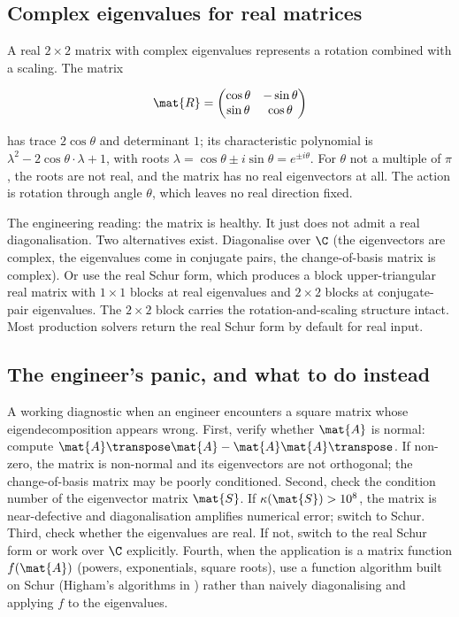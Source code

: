 \subsection{Complex eigenvalues for real matrices}

A real $2 \times 2$ matrix with complex eigenvalues represents a
rotation combined with a scaling. The matrix

\[
\mat{R} = \begin{pmatrix} \cos\theta & -\sin\theta \\ \sin\theta &
\cos\theta \end{pmatrix}
\]

has trace $2\cos\theta$ and determinant $1$; its characteristic
polynomial is $\lambda^{2} - 2\cos\theta \cdot \lambda + 1$, with
roots $\lambda = \cos\theta \pm i \sin\theta = e^{\pm i \theta}$.
For $\theta$ not a multiple of $\pi$, the roots are not real, and
the matrix has no real eigenvectors at all. The action is rotation
through angle $\theta$, which leaves no real direction fixed.

The engineering reading: the matrix is healthy. It just does not
admit a real diagonalisation. Two alternatives exist. Diagonalise
over $\C$ (the eigenvectors are complex, the eigenvalues come in
conjugate pairs, the change-of-basis matrix is complex). Or use the
real Schur form, which produces a block upper-triangular real
matrix with $1 \times 1$ blocks at real eigenvalues and $2 \times 2$
blocks at conjugate-pair eigenvalues. The $2 \times 2$ block carries
the rotation-and-scaling structure intact. Most production solvers
return the real Schur form by default for real input.

\subsection{The engineer's panic, and what to do instead}

A working diagnostic when an engineer encounters a square matrix
whose eigendecomposition appears wrong. First, verify whether
$\mat{A}$ is normal: compute $\mat{A}\transpose \mat{A} -
\mat{A}\mat{A}\transpose$. If non-zero, the matrix is non-normal and
its eigenvectors are not orthogonal; the change-of-basis matrix may
be poorly conditioned. Second, check the condition number of the
eigenvector matrix $\mat{S}$. If $\kappa(\mat{S}) > 10^{8}$, the
matrix is near-defective and diagonalisation amplifies numerical
error; switch to Schur. Third, check whether the eigenvalues are
real. If not, switch to the real Schur form or work over $\C$
explicitly. Fourth, when the application is a matrix function
$f(\mat{A})$ (powers, exponentials, square roots), use a function
algorithm built on Schur (Higham's algorithms in
\cite[ch.~28]{text:trefethen-bau1997}) rather than naively
diagonalising and applying $f$ to the eigenvalues.

